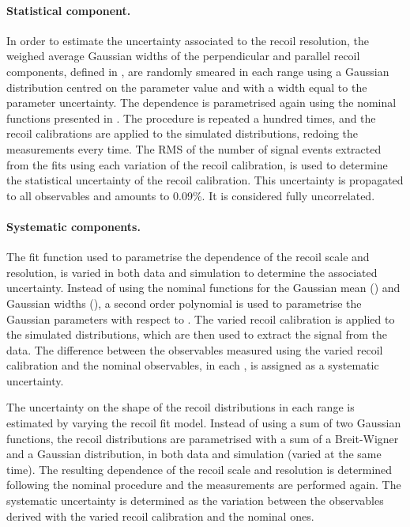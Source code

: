 \paragraph{Statistical component.} In order to estimate the uncertainty associated to the recoil resolution, the weighed average Gaussian widths of the perpendicular and parallel recoil components, defined in , are randomly smeared in each \qtZ range using a Gaussian distribution centred on the parameter value and with a width equal to the parameter uncertainty. The \qt dependence is parametrised again using the nominal functions presented in . The procedure is repeated a hundred times, and the recoil calibrations are applied to the simulated \ptmiss distributions, redoing the measurements every time. The RMS of the number of signal events extracted from the fits using each variation of the recoil calibration, is used to determine the statistical uncertainty of the recoil calibration. This uncertainty is propagated to all observables and amounts to 0.09\%. It is considered fully uncorrelated.

\paragraph{Systematic components.} The fit function used to parametrise the \qt dependence of the recoil scale and resolution, is varied in both data and simulation to determine the associated uncertainty. Instead of using the nominal functions for the Gaussian mean () and Gaussian widths (), a second order polynomial is used to parametrise the Gaussian parameters with respect to \qtZ. The varied recoil calibration is applied to the simulated \ptmiss distributions, which are then used to extract the signal from the data. The difference between the observables measured using the varied recoil calibration and the nominal observables, in each \etaMuCM, is assigned as a systematic uncertainty.

The uncertainty on the shape of the recoil distributions in each \qtZ range is estimated by varying the recoil fit model. Instead of using a sum of two Gaussian functions, the recoil distributions are parametrised with a sum of a Breit-Wigner and a Gaussian distribution, in both data and simulation (varied at the same time). The resulting \qt dependence of the recoil scale and resolution is determined following the nominal procedure and the measurements are performed again. The systematic uncertainty is determined as the variation between the observables derived with the varied recoil calibration and the nominal ones.

